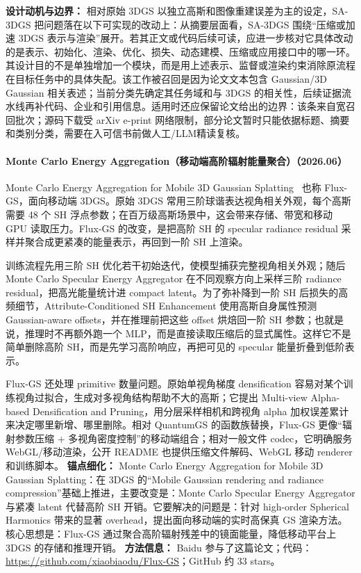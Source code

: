 \textbf{设计动机与边界：} 相对原始 3DGS 以独立高斯和图像重建误差为主的设定，SA-3DGS 把问题落在以下可实现的改动上：从摘要层面看，SA-3DGS 围绕“压缩或加速 3DGS 表示与渲染”展开。若其正文或代码后续可读，应进一步核对它具体改动的是表示、初始化、渲染、优化、损失、动态建模、压缩或应用接口中的哪一环。其设计目的不是单独增加一个模块，而是用上述表示、监督或渲染约束消除原流程在目标任务中的具体失配。该工作被召回是因为论文文本包含 Gaussian/3D Gaussian 相关表述；当前分类先确定其任务域和与 3DGS 的相关性，后续证据流水线再补代码、企业和引用信息。适用时还应保留论文给出的边界：该条来自宽召回批次；源码下载受 arXiv e-print 网络限制，部分论文暂时只能依据标题、摘要和类别分类，需要在入可信书前做人工/LLM精读复核。
\paragraph{Monte Carlo Energy Aggregation（移动端高阶辐射能量聚合）（2026.06）}
Monte Carlo Energy Aggregation for Mobile 3D Gaussian Splatting~\cite{2606_30017} 也称 Flux-GS，面向移动端 3DGS。原始 3DGS 常用三阶球谐表达视角相关外观，每个高斯需要 48 个 SH 浮点参数；在百万级高斯场景中，这会带来存储、带宽和移动 GPU 读取压力。Flux-GS 的改变，是把高阶 SH 的 specular radiance residual 采样并聚合成更紧凑的能量表示，再回到一阶 SH 上渲染。

训练流程先用三阶 SH 优化若干初始迭代，使模型捕获完整视角相关外观；随后 Monte Carlo Specular Energy Aggregator 在不同观察方向上采样三阶 radiance residual，把高光能量统计进 compact latent。为了弥补降到一阶 SH 后损失的高频细节，Attribute-Conditioned SH Enhancement 使用高斯自身属性预测 Gaussian-aware offsets，并在推理前把这些 offset 烘焙回一阶 SH 参数；也就是说，推理时不再额外跑一个 MLP，而是直接读取压缩后的显式属性。这样它不是简单删除高阶 SH，而是先学习高阶响应，再把可见的 specular 能量折叠到低阶表示。

Flux-GS 还处理 primitive 数量问题。原始单视角梯度 densification 容易对某个训练视角过拟合，生成对多视角结构帮助不大的高斯；它提出 Multi-view Alpha-based Densification and Pruning，用分层采样相机和跨视角 alpha 加权误差累计来决定哪里新增、哪里删除。相对 QuantumGS 的函数族替换，Flux-GS 更像“辐射参数压缩 + 多视角密度控制”的移动端组合；相对一般文件 codec，它明确服务 WebGL/移动渲染，公开 README 也提供压缩文件解码、WebGL 移动 renderer 和训练脚本。
\textbf{锚点细化：} Monte Carlo Energy Aggregation for Mobile 3D Gaussian Splatting：在 3DGS 的“Mobile Gaussian rendering and radiance compression”基础上推进，主要改变是：Monte Carlo Specular Energy Aggregator 与紧凑 latent 代替高阶 SH 开销。它要解决的问题是：针对 high-order Spherical Harmonics 带来的显著 overhead，提出面向移动端的实时高保真 GS 渲染方法。核心思想是：Flux-GS 通过聚合高阶辐射残差中的镜面能量，降低移动平台上 3DGS 的存储和推理开销。
\textbf{方法信息：} Baidu 参与了这篇论文；代码：\url{https://github.com/xiaobiaodu/Flux-GS}；GitHub 约 33 stars。

